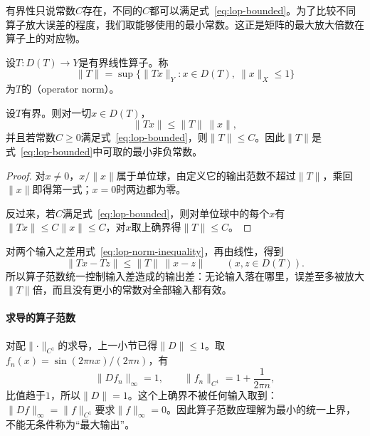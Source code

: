有界性只说常数$C$存在，不同的$C$都可以满足式~\eqref{eq:lop-bounded}。为了比较不同算子放大误差的程度，我们取能够使用的最小常数。这正是矩阵的最大放大倍数在算子上的对应物。

\begin{definition}[算子范数]
\label{def:lop-operator-norm}
设$T:D(T)\to Y$是有界线性算子。称
\begin{equation}
 \lVert T\rVert=\sup\{\lVert Tx\rVert_Y:x\in D(T),\ \lVert x\rVert_X\leq1\}
 \label{eq:lop-operator-norm}
\end{equation}
为$T$的（operator norm）。
\end{definition}

\begin{theorem}[算子范数是最小的误差常数]
\label{thm:lop-norm-minimal}
设$T$有界。则对一切$x\in D(T)$，
\begin{equation}
 \lVert Tx\rVert\leq\lVert T\rVert\,\lVert x\rVert,
 \label{eq:lop-norm-inequality}
\end{equation}
并且若常数$C\geq0$满足式~\eqref{eq:lop-bounded}，则$\lVert T\rVert\leq C$。因此$\lVert T\rVert$是式~\eqref{eq:lop-bounded}中可取的最小非负常数。
\end{theorem}

\begin{proof}
对$x\neq0$，$x/\lVert x\rVert$属于单位球，由定义它的输出范数不超过$\lVert T\rVert$，乘回$\lVert x\rVert$即得第一式；$x=0$时两边都为零。

反过来，若$C$满足式~\eqref{eq:lop-bounded}，则对单位球中的每个$x$有$\lVert Tx\rVert\leq C\lVert x\rVert\leq C$，对$x$取上确界得$\lVert T\rVert\leq C$。
\end{proof}

对两个输入之差用式~\eqref{eq:lop-norm-inequality}，再由线性，得到
\begin{equation}
 \lVert Tx-Tz\rVert\leq\lVert T\rVert\,\lVert x-z\rVert\qquad(x,z\in D(T)).
 \label{eq:lop-lipschitz}
\end{equation}
所以算子范数统一控制输入差造成的输出差：无论输入落在哪里，误差至多被放大$\lVert T\rVert$倍，而且没有更小的常数对全部输入都有效。

\paragraph{求导的算子范数}
对配$\lVert\cdot\rVert_{C^1}$的求导，上一小节已得$\lVert D\rVert\leq1$。取$f_n(x)=\sin(2\pi nx)/(2\pi n)$，有
\[
 \lVert Df_n\rVert_\infty=1,\qquad\lVert f_n\rVert_{C^1}=1+\frac1{2\pi n},
\]
比值趋于$1$，所以$\lVert D\rVert=1$。这个上确界不被任何输入取到：$\lVert Df\rVert_\infty=\lVert f\rVert_{C^1}$要求$\lVert f\rVert_\infty=0$。因此算子范数应理解为最小的统一上界，不能无条件称为“最大输出”。

